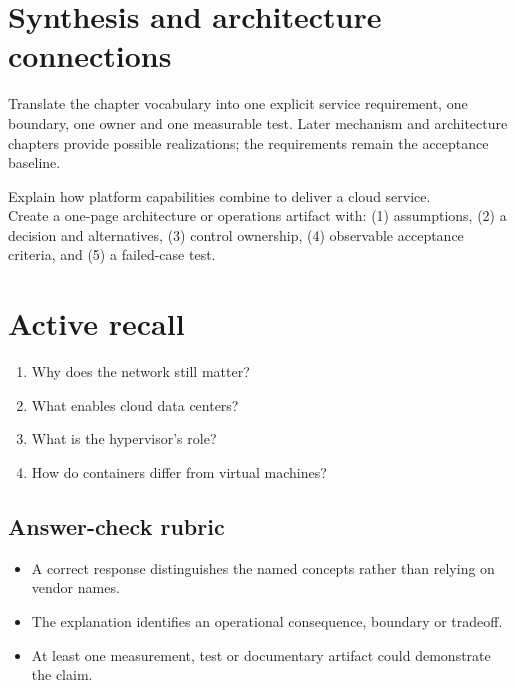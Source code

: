 \documentclass[10pt,letterpaper]{article}
\begin{document}
\section{Synthesis and architecture connections}
Translate the chapter vocabulary into one explicit service requirement, one boundary, one owner and one measurable test. Later mechanism and architecture chapters provide possible realizations; the requirements remain the acceptance baseline.
\begin{workbox}[title={Applied deliverable}]
Explain how platform capabilities combine to deliver a cloud service.\\[4pt]Create a one-page architecture or operations artifact with: (1) assumptions, (2) a decision and alternatives, (3) control ownership, (4) observable acceptance criteria, and (5) a failed-case test.
\end{workbox}
\section{Active recall}
\begin{enumerate}
\item Why does the network still matter?
\item What enables cloud data centers?
\item What is the hypervisor's role?
\item How do containers differ from virtual machines?
\end{enumerate}
\subsection{Answer-check rubric}
\begin{itemize}
\item A correct response distinguishes the named concepts rather than relying on vendor names.
\item The explanation identifies an operational consequence, boundary or tradeoff.
\item At least one measurement, test or documentary artifact could demonstrate the claim.
\end{itemize}
\end{document}
